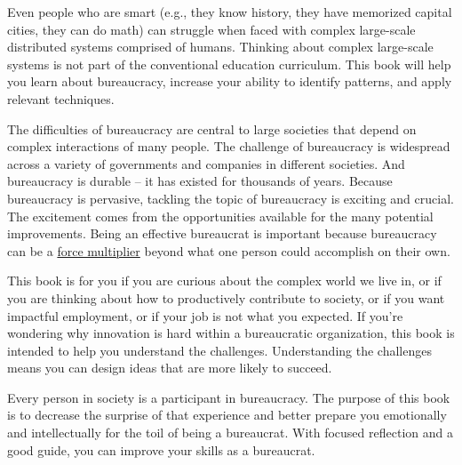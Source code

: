 Even people who are smart (e.g., they know history, they have memorized capital cities, they can do math) can struggle when faced with complex large-scale distributed systems comprised of humans. Thinking about complex large-scale systems is not part of the conventional education curriculum. This book will help you learn about bureaucracy, increase your ability to identify patterns, and apply relevant techniques.


The difficulties of bureaucracy are central to large societies that depend on complex interactions of many people. The challenge of bureaucracy is widespread across a variety of governments and companies in different societies. And bureaucracy is durable -- it has existed for thousands of years. Because bureaucracy is pervasive, tackling the topic of bureaucracy is exciting and crucial. The excitement comes from the opportunities available for the many potential improvements.
Being an effective bureaucrat is important because bureaucracy can be a \href{https://en.wikipedia.org/wiki/Force_multiplication}{force multiplier}
beyond what one person could accomplish on their own.


This book is for you if you are curious about the complex world we live in, or if you are thinking about how to productively contribute to society, or if you want impactful employment, or if your job is not what you expected. If you're wondering why innovation is hard within a bureaucratic organization, this book is intended to help you understand the challenges. Understanding the challenges means you can design ideas that are more likely to succeed.


Every person in society is a participant in bureaucracy. The purpose of this book is to decrease the surprise of that experience and better prepare you emotionally and intellectually for the toil of being a bureaucrat. With focused reflection and a good guide, you can improve your skills as a bureaucrat. 

